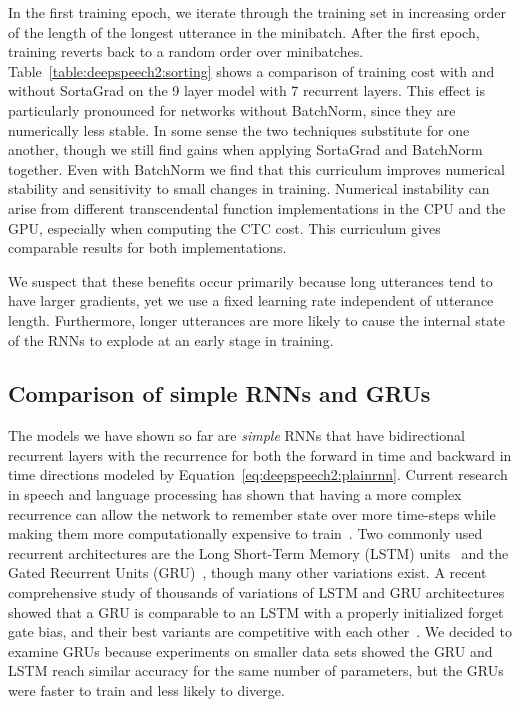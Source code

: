 In the first training epoch, we iterate through the training set in increasing
order of the length of the longest utterance in the minibatch. After the first
epoch, training reverts back to a random order over minibatches.
Table~\ref{table:deepspeech2:sorting} shows a comparison of training cost with
and without SortaGrad on the 9 layer model with 7 recurrent layers. This effect
is particularly pronounced for networks without BatchNorm, since they are
numerically less stable. In some sense the two techniques substitute for one
another, though we still find gains when applying SortaGrad and BatchNorm
together. Even with BatchNorm we find that this curriculum improves numerical
stability and sensitivity to small changes in training. Numerical instability
can arise from different transcendental function implementations in the CPU and
the GPU, especially when computing the CTC cost. This curriculum gives
comparable results for both implementations.

We suspect that these benefits occur primarily because long utterances tend to
have larger gradients, yet we use a fixed learning rate independent of
utterance length. Furthermore, longer utterances are more likely to cause the
internal state of the RNNs to explode at an early stage in training.

\subsection{Comparison of simple RNNs and GRUs}

The models we have shown so far are \emph{simple} RNNs that have bidirectional
recurrent layers with the recurrence for both the forward in time and backward
in time directions modeled by Equation~\ref{eq:deepspeech2:plainrnn}. Current
research in speech and language processing has shown that having a more complex
recurrence can allow the network to remember state over more time-steps while
making them more computationally expensive to train~\cite{sainath2015,
chan2016, sutskever2014, bahdanau2016}. Two commonly used recurrent
architectures are the Long Short-Term Memory (LSTM)
units~\cite{hochreiter1997} and the Gated Recurrent Units
(GRU)~\cite{cho2014}, though many other variations exist. A recent
comprehensive study of thousands of variations of LSTM and GRU architectures
showed that a GRU is comparable to an LSTM with a properly initialized forget
gate bias, and their best variants are competitive with each
other~\cite{jozefowicz2015}. We decided to examine GRUs because experiments on
smaller data sets showed the GRU and LSTM reach similar accuracy for the same
number of parameters, but the GRUs were faster to train and less likely to
diverge. 

